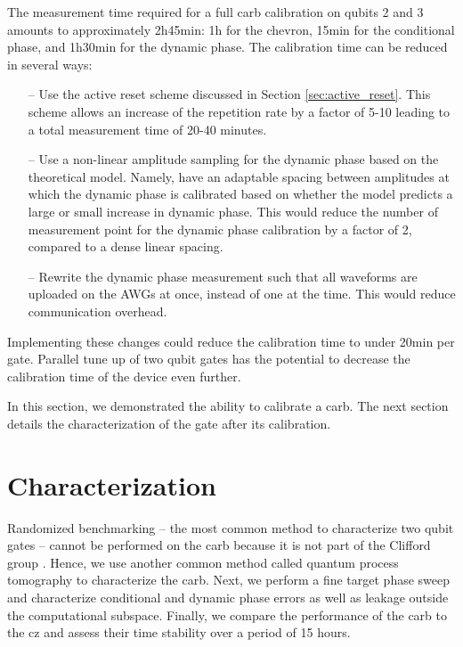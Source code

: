 The measurement time required for a full \gls{carb} calibration on qubits 2 and 3 amounts to approximately 2h45min: 1h for the chevron, 15min for the conditional phase, and 1h30min for the dynamic phase. The calibration time can be reduced in several ways:
\begin{itemize}
    \item[--] Use the active reset scheme discussed in Section \ref{sec:active_reset}. This scheme allows an increase of the repetition rate by a factor of 5-10 leading to a total measurement time of 20-40 minutes.
    \item[--] Use a non-linear amplitude sampling for the dynamic phase based on the theoretical model. Namely, have an adaptable spacing between amplitudes at which the dynamic phase is calibrated based on whether the model predicts a large or small increase in dynamic phase. This would reduce the number of measurement point for the dynamic phase calibration by a factor of 2, compared to a dense linear spacing.
    \item[--] Rewrite the dynamic phase measurement such that all waveforms are uploaded on the AWGs at once, instead of one at the time. This would reduce communication overhead.
\end{itemize}
Implementing these changes could reduce the calibration time to under 20min per gate. Parallel tune up of two qubit gates has the potential to decrease the calibration time of the device even further. 

In this section, we demonstrated the ability to calibrate a \gls{carb}. The next section details the characterization of the gate after its calibration.

\section{Characterization} 
Randomized benchmarking -- the most common method to characterize two qubit gates -- cannot be performed on the \gls{carb} because it is not part of the Clifford group \cite{Magesan2011ScalableProcesses, Magesan2012CharacterizingBenchmarking}. Hence, we use another common method called quantum process tomography to characterize the \gls{carb}. Next, we perform a fine target phase sweep and characterize conditional and dynamic phase errors as well as leakage outside the computational subspace. Finally, we compare the performance of the \gls{carb} to the \gls{cz} and assess their time stability over a period of 15 hours.

